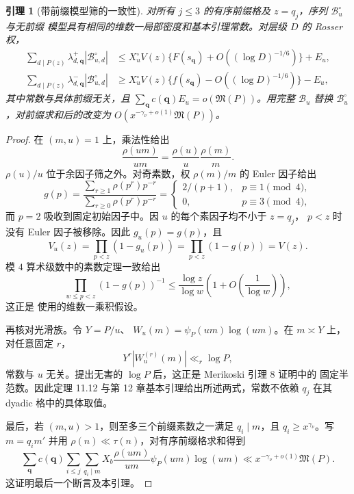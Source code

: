 \documentclass[UTF8,10pt,a4paper]{ctexart}
\newcommand{\Bcal}{\mathcal{B}}
\newcommand{\1}{\mathbf{1}}
\newtheorem{lemma}[theorem]{引理}
\theoremstyle{remark}
\begin{document}
\begin{lemma}[带前缀模型筛的一致性]\label{lem:uniform-prefixed-model-zh}
对所有 $j\le3$ 的有序前缀格及 $z=q_j$，序列 $\Bcal_u^{\circ}$ 与无前缀
模型具有相同的维数一局部密度和基本引理常数。对层级 $D$ 的 Rosser 权，
\begin{align*}
 \sum_{d\mid P(z)}\lambda_{d,\boldsymbol q}^{+}|\Bcal_{u,d}^{\circ}|
 &\le X_u^{\circ}V(z)
 \{F(s_{\boldsymbol q})+O((\log D)^{-1/6})\}+E_u,\\
 \sum_{d\mid P(z)}\lambda_{d,\boldsymbol q}^{-}|\Bcal_{u,d}^{\circ}|
 &\ge X_u^{\circ}V(z)
 \{f(s_{\boldsymbol q})-O((\log D)^{-1/6})\}-E_u,
\end{align*}
其中常数与具体前缀无关，且
$\sum_{\boldsymbol q}c(\boldsymbol q)E_u=o(\mathfrak M(P))$。用完整
$\Bcal_u$ 替换 $\Bcal_u^{\circ}$，对前缀求和后的改变为
$O(x^{-\gamma_\nu+o(1)}\mathfrak M(P))$。
\end{lemma}

\begin{proof}
在 $(m,u)=1$ 上，乘法性给出
\[
 \frac{\rho(um)}{um}=\frac{\rho(u)}u\frac{\rho(m)}m.
\]
$\rho(u)/u$ 位于余因子筛之外。对奇素数，权 $\rho(m)/m$ 的 Euler 因子给出
\[
 g(p)=
 \frac{\sum_{r\ge1}\rho(p^r)p^{-r}}
      {\sum_{r\ge0}\rho(p^r)p^{-r}}
 =\begin{cases}2/(p+1),&p\equiv1\pmod4,\\0,&p\equiv3\pmod4,
 \end{cases}
\]
而 $p=2$ 吸收到固定初始因子中。因 $u$ 的每个素因子均不小于 $z=q_j$，
$p<z$ 时没有 Euler 因子被移除。因此 $g_u(p)=g(p)$，且
\[
 V_u(z)=\prod_{p<z}(1-g_u(p))=\prod_{p<z}(1-g(p))=V(z).
\]
模 $4$ 算术级数中的素数定理一致给出
\[
 \prod_{w\le p<z}(1-g(p))^{-1}
 \le\frac{\log z}{\log w}
 \left(1+O\!\left(\frac1{\log w}\right)\right),
\]
这正是 \cite[Theorem 11.12 and Chapter 12]{FriedlanderIwaniec2010}
使用的维数一乘积假设。

再核对光滑族。令 $Y=P/u$、
$W_u(m)=\psi_P(um)\log(um)$。在 $m\asymp Y$ 上，对任意固定 $r$，
\[
 Y^r|W_u^{(r)}(m)|\ll_r\log P,
\]
常数与 $u$ 无关。提出无害的 $\log P$ 后，这正是 Merikoski 引理 8 证明中的
固定半范数。因此定理 11.12 与第 12 章基本引理给出所述两式，常数不依赖
$q_j$ 在其 dyadic 格中的具体取值。

最后，若 $(m,u)>1$，则至多三个前缀素数之一满足
$q_i\mid m$，且 $q_i\ge x^{\gamma_\nu}$。写 $m=q_im'$ 并用
$\rho(n)\ll\tau(n)$，对有序前缀格求和得到
\[
 \sum_{\boldsymbol q}c(\boldsymbol q)
 \sum_{i\le j}\sum_{q_i\mid m}
 X_b\frac{\rho(um)}{um}\psi_P(um)\log(um)
 \ll x^{-\gamma_\nu+o(1)}\mathfrak M(P).
\]
这证明最后一个断言及本引理。
\end{proof}
\end{document}
